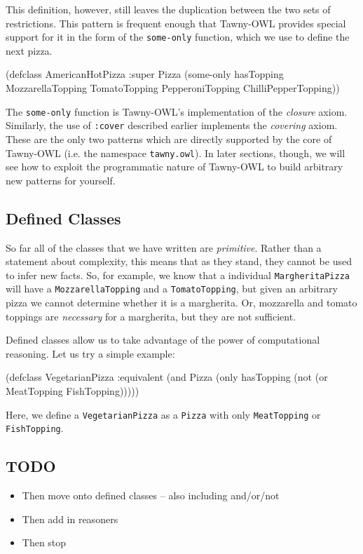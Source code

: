 This definition, however, still leaves the duplication between the two sets of
restrictions. This pattern is frequent enough that Tawny-OWL provides special
support for it in the form of the \verb~some-only~ function, which we use to define
the next pizza.

\begin{tawny}
(defclass AmericanHotPizza
  :super
  Pizza
  (some-only hasTopping MozzarellaTopping TomatoTopping
	     PepperoniTopping ChilliPepperTopping))
\end{tawny}

The \verb~some-only~ function is Tawny-OWL's implementation of the \emph{closure} axiom.
Similarly, the use of \verb~:cover~ described earlier implements the \emph{covering}
axiom. These are the only two patterns which are directly supported by the
core of Tawny-OWL (i.e. the namespace \verb~tawny.owl~). In later sections, though,
we will see how to exploit the programmatic nature of Tawny-OWL to build
arbitrary new patterns for yourself.


\subsection{Defined Classes}
\label{sec-5-7}
\label{defined}

So far all of the classes that we have written are \emph{primitive}. Rather than a
statement about complexity, this means that as they stand, they cannot be used
to infer new facts. So, for example, we know that a individual
\verb~MargheritaPizza~ will have a \verb~MozzarellaTopping~ and a \verb~TomatoTopping~, but
given an arbitrary pizza we cannot determine whether it is a margherita. Or,
mozzarella and tomato toppings are \emph{necessary} for a margherita, but they are
not sufficient.

Defined classes allow us to take advantage of the power of computational
reasoning. Let us try a simple example:

\begin{tawny}
(defclass VegetarianPizza
  :equivalent
  (and Pizza
       (only hasTopping
	     (not (or MeatTopping FishTopping)))))
\end{tawny}

Here, we define a \verb~VegetarianPizza~ as a \verb~Pizza~ with only \verb~MeatTopping~ or
\verb~FishTopping~.


\subsection{{\bfseries\sffamily TODO} }
\label{sec-5-8}

\begin{itemize}
\item Then move onto defined classes -- also including and/or/not
\item Then add in reasoners
\item Then stop
\end{itemize}

